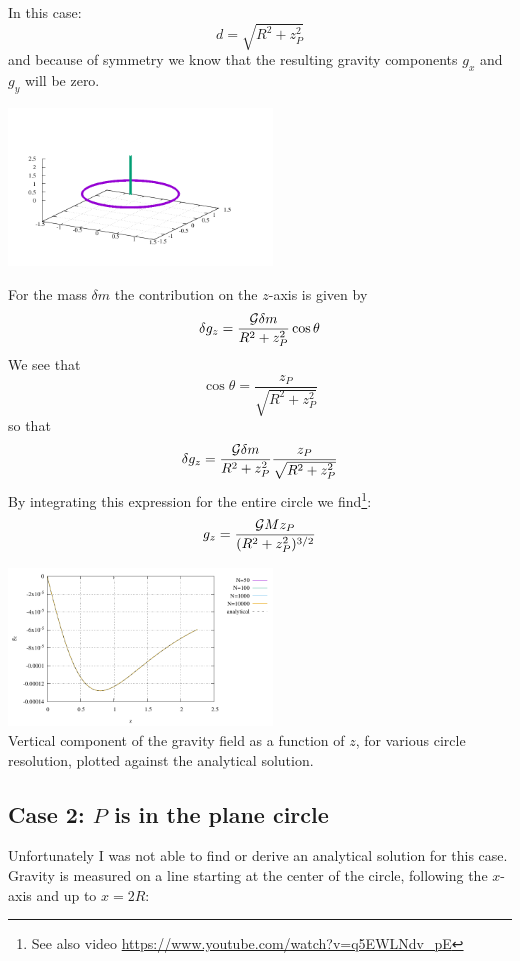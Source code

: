 In this case:
\[
d=\sqrt{R^2 + z_P^2}
\]
and because of symmetry we know that the resulting 
gravity components $g_x$ and $g_y$ will be zero.

\begin{center}
\includegraphics[width=7cm]{python_codes/fieldstone_132/results/case1/setup.pdf}
\end{center}

For the mass $\delta m$ the contribution on the $z$-axis is given by 
\[
\delta g_z = \frac{{\cal G} \delta m}{R^2+z_P^2} \cos\theta 
\] 
We see that 
\[
\cos\theta = \frac{z_P}{\sqrt{R^2+z_P^2}}
\]
so that
\[
\delta g_z = \frac{{\cal G} \delta m}{R^2+z_P^2}\frac{z_P}{\sqrt{R^2+z_P^2}}
\] 
By integrating this expression for the entire circle we 
find\footnote{See also video \url{https://www.youtube.com/watch?v=q5EWLNdv_pE}}:
\[
g_z=\frac{{\cal G} M z_P}{(R^2+z_P^2)^{3/2}}
\]

\begin{center}
\includegraphics[width=7cm]{python_codes/fieldstone_132/results/case1/gz.pdf}\\
{\captionfont Vertical component of the gravity field as a function of $z$, 
for various circle resolution, plotted against the analytical solution.}
\end{center}



\subsection*{Case 2: $P$ is in the plane circle}

Unfortunately I was not able to find or derive an analytical solution for this case.
Gravity is measured on a line starting at the center of the circle, following the 
$x$-axis and up to $x=2R$:

